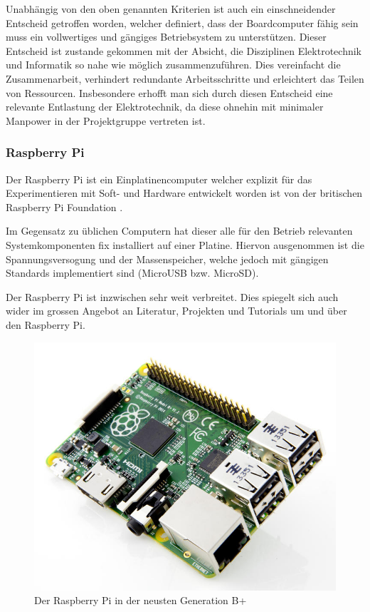 Unabhängig von den oben genannten Kriterien ist auch ein einschneidender
Entscheid getroffen worden, welcher definiert, dass der Boardcomputer
fähig sein muss ein vollwertiges und gängiges Betriebsystem zu 
unterstützen. Dieser Entscheid ist zustande gekommen mit der Absicht, die
Disziplinen Elektrotechnik und Informatik so nahe wie möglich 
zusammenzuführen. Dies vereinfacht die Zusammenarbeit, verhindert 
redundante Arbeitsschritte und erleichtert das Teilen von Ressourcen.
Insbesondere erhofft man sich durch diesen Entscheid eine relevante 
Entlastung der Elektrotechnik, da diese ohnehin mit minimaler Manpower in
der Projektgruppe vertreten ist.

\subsubsection{Raspberry Pi}
\label{ssc_raspberry_pi}
Der Raspberry Pi ist ein Einplatinencomputer welcher explizit für
das Experimentieren mit Soft- und Hardware entwickelt worden ist von
der britischen Raspberry Pi Foundation \cite{RPiFoundation}.

Im Gegensatz zu üblichen Computern hat dieser alle für den Betrieb
relevanten Systemkomponenten fix installiert auf einer Platine. Hiervon
ausgenommen ist die Spannungsversogung und der Massenspeicher, welche
jedoch mit gängigen Standards implementiert sind (MicroUSB bzw. MicroSD).

Der Raspberry Pi ist inzwischen sehr weit verbreitet. Dies spiegelt sich
auch wider im grossen Angebot an Literatur, Projekten und Tutorials um
und über den Raspberry Pi.

\begin{figure}[h!]
	\centering
	\includegraphics[scale=1]{../../fig/raspberry-pi-b-plus.jpg}
	\caption{Der Raspberry Pi in der neusten Generation B+ 
		\protect\cite{cnet}}
\end{figure}

